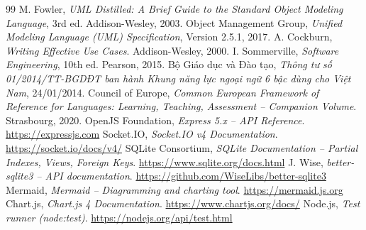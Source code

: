 \documentclass[13pt,a4paper,oneside]{extreport}
\begin{document}
\setcounter{page}{2}


\tableofcontents
\clearpage
\listoffigures
\clearpage
\listoftables
\clearpage


\clearpage
{}







\clearpage
{}
{}
\renewcommand{\bibname}{Tài liệu tham khảo}
\begin{thebibliography}{99}\setlength{\itemsep}{2pt}
   M. Fowler, \textit{UML Distilled: A Brief Guide to the Standard Object Modeling Language}, 3rd ed. Addison-Wesley, 2003.
   Object Management Group, \textit{Unified Modeling Language (UML) Specification}, Version 2.5.1, 2017.
   A. Cockburn, \textit{Writing Effective Use Cases}. Addison-Wesley, 2000.
   I. Sommerville, \textit{Software Engineering}, 10th ed. Pearson, 2015.
   Bộ Giáo dục và Đào tạo, \textit{Thông tư số 01/2014/TT-BGDĐT ban hành Khung năng lực ngoại ngữ 6 bậc dùng cho Việt Nam}, 24/01/2014.
   Council of Europe, \textit{Common European Framework of Reference for Languages: Learning, Teaching, Assessment – Companion Volume}. Strasbourg, 2020.
   OpenJS Foundation, \textit{Express 5.x – API Reference}. \url{https://expressjs.com}
   Socket.IO, \textit{Socket.IO v4 Documentation}. \url{https://socket.io/docs/v4/}
   SQLite Consortium, \textit{SQLite Documentation – Partial Indexes, Views, Foreign Keys}. \url{https://www.sqlite.org/docs.html}
   J. Wise, \textit{better-sqlite3 – API documentation}. \url{https://github.com/WiseLibs/better-sqlite3}
   Mermaid, \textit{Mermaid – Diagramming and charting tool}. \url{https://mermaid.js.org}
   Chart.js, \textit{Chart.js 4 Documentation}. \url{https://www.chartjs.org/docs/}
   Node.js, \textit{Test runner (node:test)}. \url{https://nodejs.org/api/test.html}
\end{thebibliography}

\appendix

\end{document}
